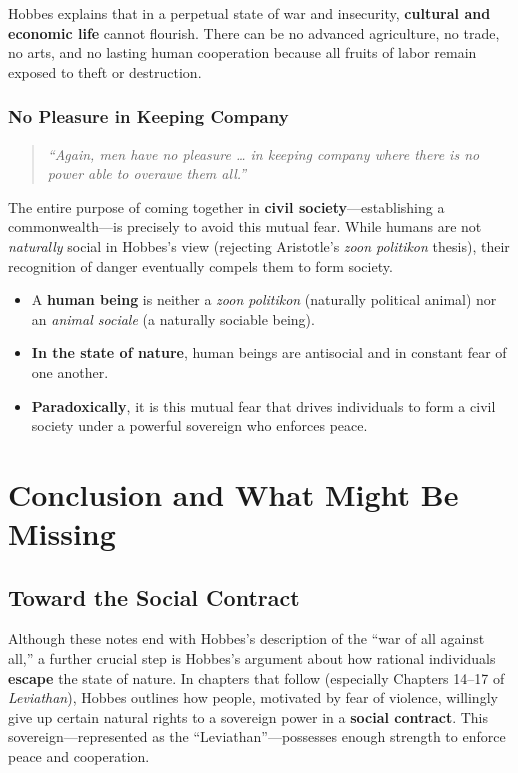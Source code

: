 Hobbes explains that in a perpetual state of war and insecurity, \textbf{cultural and economic life} cannot flourish. There can be no advanced agriculture, no trade, no arts, and no lasting human cooperation because all fruits of labor remain exposed to theft or destruction.

\subsubsection*{No Pleasure in Keeping Company}

\begin{quote}
\textit{“Again, men have no pleasure … in keeping company where there is no power able to overawe them all.”}
\end{quote}

The entire purpose of coming together in \textbf{civil society}---establishing a commonwealth---is precisely to avoid this mutual fear. While humans are not \textit{naturally} social in Hobbes’s view (rejecting Aristotle’s \textit{zoon politikon} thesis), their recognition of danger eventually compels them to form society.

\begin{remark}
\begin{itemize}
  \item A \textbf{human being} is neither a \textit{zoon politikon} (naturally political animal) nor an \textit{animal sociale} (a naturally sociable being).
  \item \textbf{In the state of nature}, human beings are antisocial and in constant fear of one another.
  \item \textbf{Paradoxically}, it is this mutual fear that drives individuals to form a civil society under a powerful sovereign who enforces peace.
\end{itemize}
\end{remark}

\section*{Conclusion and What Might Be Missing}

\subsection*{Toward the Social Contract}
Although these notes end with Hobbes’s description of the “war of all against all,” a further crucial step is Hobbes’s argument about how rational individuals \textbf{escape} the state of nature. In chapters that follow (especially Chapters 14--17 of \textit{Leviathan}), Hobbes outlines how people, motivated by fear of violence, willingly give up certain natural rights to a sovereign power in a \textbf{social contract}. This sovereign---represented as the “Leviathan”---possesses enough strength to enforce peace and cooperation.


